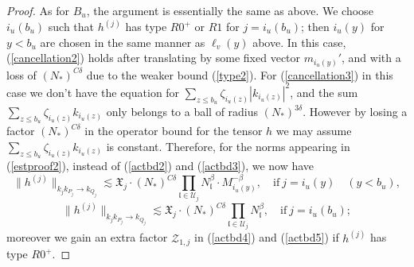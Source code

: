 \documentclass[11 pt,reqno]{amsart}
\theoremstyle{definition}
\theoremstyle{remark}
\numberwithin{equation}{section}
\newcommand{\Uc}{\mathcal{U}}
\newcommand{\Zc}{\mathcal{Z}}
\newcommand{\Xf}{\mathfrak{X}}
\newcommand{\lf}{\mathfrak{l}}
\begin{document}
{\begin{proof}
  As for $B_u$, the argument is essentially the same as above. We choose $i_u(b_u)$ such that $h^{(j)}$ has type $R0^+$ or $R1$ for $j=i_u(b_u)$; then $i_u(y)$ for $y<b_u$ are chosen in the same manner as $\ell_{v}(y)$ above.
 In this case,  (\ref{cancellation2}) holds after translating by some fixed vector $m_{i_u(y)}'$, and with a loss of $(N_*)^{C\delta}$ due to the weaker bound (\ref{type2}). For (\ref{cancellation3}) in this case we don't have the equation for $\sum_{z\leq b_u}\zeta_{i_u(z)}|k_{i_u(z)}|^2$, and the sum $\sum_{z\leq b_u}\zeta_{i_u(z)}k_{i_u(z)}$ only belongs to a ball of radius $(N_*)^{3\delta}$. However by losing a factor $(N_*)^{C\delta}$ in the operator bound for the tensor $h$ we may assume $\sum_{z\leq b_u}\zeta_{i_u(z)}k_{i_u(z)}$ is constant. Therefore, for the norms appearing in (\ref{estproof2}), instead of (\ref{actbd2}) and (\ref{actbd3}), we now have\begin{equation}\label{actbd4}\|h^{(j)}\|_{k_jk_{P_j}\to k_{Q_j}}\lesssim \Xf_j\cdot(N_*)^{C\delta}\prod_{\lf\in \Uc_j}N_\lf^{\beta}\cdot M_{i_u(y)}^{-\beta},\quad \mathrm{if\ }j=i_u(y)\quad(y<b_u),
  \end{equation}
    \begin{equation}\label{actbd5} \|h^{(j)}\|_{k_jk_{P_j}\to k_{Q_j}}\lesssim \Xf_j\cdot(N_*)^{C\delta}\prod_{\lf\in \Uc_j}N_\lf^{\beta},\quad  \mathrm{if\ }j=i_u(b_u);
  \end{equation} moreover we gain an extra factor $\Zc_{1,j}$ in (\ref{actbd4}) and (\ref{actbd5}) if $h^{(j)}$ has type $R0^+$.
  

\end{proof}}
\end{document}
